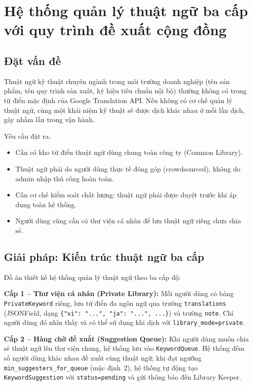 \section{Hệ thống quản lý thuật ngữ ba cấp với quy trình đề xuất cộng đồng}

\subsection{Đặt vấn đề}

Thuật ngữ kỹ thuật chuyên ngành trong môi trường doanh nghiệp (tên sản phẩm, tên quy trình
sản xuất, ký hiệu tiêu chuẩn nội bộ) thường không có trong từ điển mặc định của Google Translation API. Nếu không có cơ chế quản lý thuật
ngữ, cùng một khái niệm kỹ thuật sẽ được dịch khác nhau ở mỗi lần dịch, gây nhầm lẫn trong
vận hành.

Yêu cầu đặt ra:
\begin{itemize}
  \item Cần có kho từ điển thuật ngữ dùng chung toàn công ty (Common Library).
  \item Thuật ngữ phải do người dùng thực tế đóng góp (crowdsourced), không do admin nhập thủ
    công hoàn toàn.
  \item Cần cơ chế kiểm soát chất lượng: thuật ngữ phải được duyệt trước khi áp dụng toàn hệ
    thống.
  \item Người dùng cũng cần có thư viện cá nhân để lưu thuật ngữ riêng chưa chia sẻ.
\end{itemize}

\subsection{Giải pháp: Kiến trúc thuật ngữ ba cấp}

Đồ án thiết kế hệ thống quản lý thuật ngữ theo ba cấp độ:

\textbf{Cấp 1 -- Thư viện cá nhân (Private Library):} Mỗi người dùng có bảng
\texttt{PrivateKeyword} riêng, lưu từ điển đa ngôn ngữ qua trường \texttt{translations}
(JSONField, dạng \texttt{\{"vi": "...", "ja": "...", ...\}}) và trường \texttt{note}. Chỉ
người dùng đó nhìn thấy và có thể sử dụng khi dịch với \texttt{library\_mode=private}.

\textbf{Cấp 2 -- Hàng chờ đề xuất (Suggestion Queue):} Khi người dùng muốn chia sẻ thuật
ngữ lên thư viện chung, hệ thống lưu vào \texttt{KeywordQueue}. Hệ thống đếm số người dùng
khác nhau đề xuất cùng thuật ngữ; khi đạt ngưỡng \texttt{min\_suggesters\_for\_queue} (mặc
định~2), hệ thống tự động tạo \texttt{KeywordSuggestion} với \texttt{status=pending} và gửi
thông báo đến Library Keeper.

